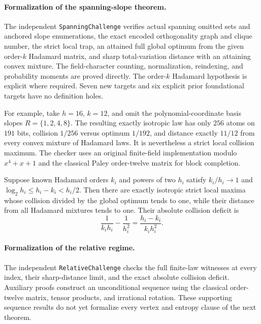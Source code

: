 \paragraph{Formalization of the spanning-slope theorem.}
The independent \texttt{SpanningChallenge} verifies actual spanning omitted
sets and anchored slope enumerations, the exact encoded orthogonality graph
and clique number, the strict local trap, an attained full global optimum
from the given order-$k$ Hadamard matrix, and sharp total-variation distance
with an attaining convex mixture. The field-character counting, normalization,
reindexing, and probability moments are proved directly. The order-$k$ Hadamard hypothesis is explicit where required. Seven new
targets and six explicit prior foundational targets have no definition holes.

For example, take $h=16$, $k=12$, and omit the polynomial-coordinate
basis slopes $R=\{1,2,4,8\}$. The resulting exactly isotropic law has
only $256$ atoms on $191$ bits, collision $1/256$ versus optimum $1/192$,
and distance exactly $11/12$ from every convex mixture of Hadamard laws.
It is nevertheless a strict local collision maximum. The checker uses
an original finite-field implementation modulo $x^4+x+1$ and the
classical Paley order-twelve matrix for block completion.

\begin{corollary}
\label{s25:cor:design-relative-regime}
Suppose known Hadamard orders $k_i$ and powers of two $h_i$ satisfy
$k_i/h_i\to1$ and
$\log_2h_i\le h_i-k_i<h_i/2$.
Then there are exactly isotropic strict local maxima whose collision
divided by the global optimum tends to one, while their distance from
all Hadamard mixtures tends to one.
Their absolute collision deficit is
\[
 \frac1{k_i h_i}-\frac1{h_i^2}
 =\frac{h_i-k_i}{k_i h_i^2}.
\]
\end{corollary}
\paragraph{Formalization of the relative regime.}
The independent \texttt{RelativeChallenge} checks the full finite-law
witnesses at every index, their sharp-distance limit, and the exact
absolute collision deficit. Auxiliary proofs construct an unconditional
sequence using the classical order-twelve matrix, tensor products,
and irrational rotation. These supporting sequence results do not yet
formalize every vertex and entropy clause of the next theorem.

